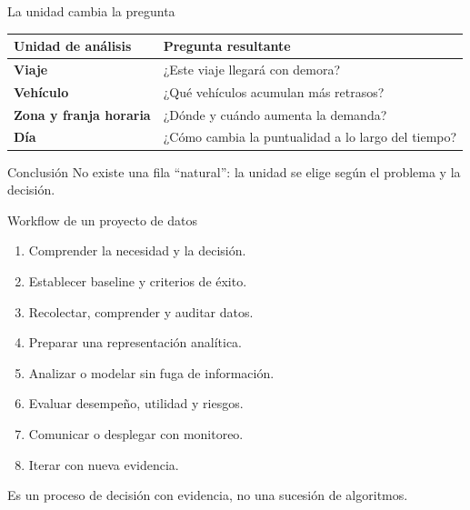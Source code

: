 \documentclass[aspectratio=169,11pt]{beamer}
\begin{document}
\begin{frame}{La unidad cambia la pregunta}
  \small
  \begin{tabularx}{\textwidth}{>{\bfseries}p{} X}
    \toprule
    Unidad de análisis & Pregunta resultante \\
    \midrule
    Viaje & ¿Este viaje llegará con demora? \\
    Vehículo & ¿Qué vehículos acumulan más retrasos? \\
    Zona y franja horaria & ¿Dónde y cuándo aumenta la demanda? \\
    Día & ¿Cómo cambia la puntualidad a lo largo del tiempo? \\
    \bottomrule
  \end{tabularx}
  \vfill
  \begin{block}{Conclusión}
    No existe una fila ``natural'': la unidad se elige según el problema y la decisión.
  \end{block}
\end{frame}

\begin{frame}{Workflow de un proyecto de datos}
  \small
  \begin{enumerate}
    \item Comprender la necesidad y la decisión.
    \item Establecer baseline y criterios de éxito.
    \item Recolectar, comprender y auditar datos.
    \item Preparar una representación analítica.
    \item Analizar o modelar sin fuga de información.
    \item Evaluar desempeño, utilidad y riesgos.
    \item Comunicar o desplegar con monitoreo.
    \item Iterar con nueva evidencia.
  \end{enumerate}
  \centering\alert{Es un proceso de decisión con evidencia, no una sucesión de algoritmos.}
\end{frame}
\end{document}

